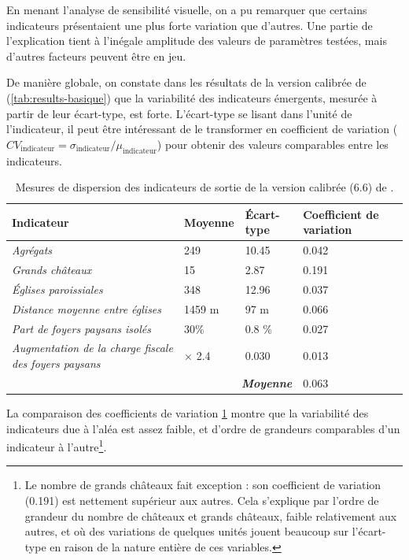 En menant l'analyse de sensibilité visuelle, on a pu remarquer que certains indicateurs présentaient une plus forte variation que d'autres.
Une partie de l'explication tient à l'inégale amplitude des valeurs de paramètres testées, mais d'autres facteurs peuvent être en jeu.

De manière globale, on constate dans les résultats de la version calibrée de \simfeodal{} (\cref{tab:results-basique}) que la variabilité des indicateurs émergents, mesurée à partir de leur écart-type, est forte.
L'écart-type se lisant dans l'unité de l'indicateur, il peut être intéressant de le transformer en coefficient de variation ($CV_{\text{indicateur}} = \sigma_{\text{indicateur}} / \mu_{\text{indicateur}}$) pour obtenir des valeurs comparables entre les indicateurs. 


\begin{table}[H]
{\renewcommand{\arraystretch}{1.1}%
	\begin{tabular}{|p{5cm}|p{2.5cm}|p{2.5cm}|p{2.5cm}|}
\hline
\textbf{Indicateur} & \textbf{Moyenne} & \textbf{Écart-type} & \textbf{Coefficient de variation} \\
\hline
\textit{Agrégats} & 249 & 10.45 & 0.042\\
\hline
\textit{Grands châteaux} & 15 & 2.87 & 0.191\\
\hline
\textit{Églises paroissiales} & 348 & 12.96 & 0.037\\
\hline
\textit{Distance moyenne entre églises} & 1459 m & 97 m & 0.066\\
\hline
\textit{Part de foyers paysans isolés} & 30\% & 0.8 \% & 0.027\\
\hline
\textit{Augmentation de la charge fiscale des foyers paysans} & $\times$ 2.4 & 0.030 & 0.013\\
\hline
\multicolumn{3}{r|}{\textbf{\textit{Moyenne}}} & 0.063\\
\cline{4-4}
	\end{tabular}
}
\caption[Mesures de dispersion des indicateurs de sortie de \simfeodal{}.]{Mesures de dispersion des indicateurs de sortie de la version calibrée (6.6) de \simfeodal{}.}
\label{tab:variabilite-indicateurs}
\end{table}

La comparaison des coefficients de variation \cref{tab:variabilite-indicateurs} montre que la variabilité des indicateurs due à l'aléa est assez faible, et d'ordre de grandeurs comparables d'un indicateur à l'autre\footnote{
	Le nombre de grands châteaux fait exception : son coefficient de variation (0.191) est nettement supérieur aux autres.
	Cela s'explique par l'ordre de grandeur du nombre de châteaux et grands châteaux, faible relativement aux autres, et où des variations de quelques unités jouent beaucoup sur l'écart-type en raison de la nature entière de ces variables.
}.

